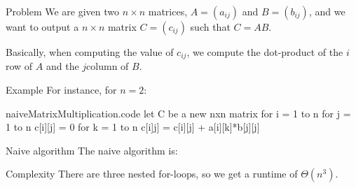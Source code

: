 \documentclass[a4paper]{article}
\begin{document}
\begin{parag}{Problem}
    We are given two $n \times n$ matrices, $A = \left(a_{ij}\right)$ and $B = \left(b_{ij}\right)$, and we want to output a $n \times n$ matrix $C = \left(c_{ij}\right)$ such that $C = AB$.

    Basically, when computing the value of $c_{ij}$, we compute the dot-product of the $i$\Th row of $A$ and the $j$\Th column of $B$.

    \begin{subparag}{Example}
        For instance, for $n = 2$: 
    \end{subparag}
\end{parag}

\begin{filecontents*}[overwrite]{naiveMatrixMultiplication.code}
let C be a new nxn matrix
for i = 1 to n
    for j = 1 to n
            c[i][j] = 0
            for k = 1 to n
                c[i]j] = c[i][j] + a[i][k]*b[j][j]
\end{filecontents*}

\begin{parag}{Naive algorithm}
    The naive algorithm is:
    
    \begin{subparag}{Complexity}
        There are three nested for-loops, so we get a runtime of $\Theta\left(n^3\right)$.
    \end{subparag}
\end{parag}
\end{document}
